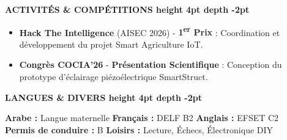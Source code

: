 \documentclass[10pt,a4paper]{../../templates/altacv}
\renewcommand{\cvsection}[2][]{%
  \vspace{3pt}%
  {\color{heading}\LARGE\bfseries #2 \hspace{0.2em}\leaders\vrule height 4pt depth -2pt\hfill\mbox{}}\par\vspace{2pt}
}
\begin{document}
\cvsection{ACTIVITÉS \& COMPÉTITIONS}
\begin{itemize}[leftmargin=*, label=\textbullet, itemsep=2pt]
  \item \textbf{Hack The Intelligence} (AISEC 2026) - \textbf{1\textsuperscript{er} Prix} : {\small Coordination et développement du projet Smart Agriculture IoT.}
  \item \textbf{Congrès COCIA'26} - \textbf{Présentation Scientifique} : {\small Conception du prototype d'éclairage piézoélectrique SmartStruct.}
\end{itemize}


\cvsection{LANGUES \& DIVERS}
\textbf{Arabe :} Langue maternelle \hfill \textbf{Français :} DELF B2 \hfill \textbf{Anglais :} EFSET C2\\[2pt]
\textbf{Permis de conduire :} B \hfill \textbf{Loisirs :} Lecture, Échecs, Électronique DIY
\end{document}

